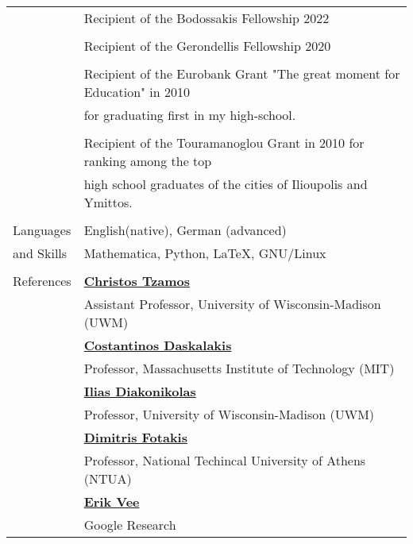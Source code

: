 \documentclass[letterpaper,11pt,oneside]{article}
\begin{document}
\begin{longtable}{@{} l l}
 & Recipient of the Bodossakis Fellowship 2022 \\
 & \\

 & Recipient of the Gerondellis Fellowship 2020 \\
 & \\

 & Recipient of the Eurobank Grant "The great moment for Education" in 2010\\
 & for graduating first in my high-school. \\
 &\\

 & Recipient of the Touramanoglou Grant in 2010 for ranking among the top \\
 & high school graduates of the cities of Ilioupolis and Ymittos. \\
 &\\

  \Large{Languages}   & English(native), German (advanced) \\
\Large{and Skills}    & Mathematica, Python, \LaTeX, GNU/Linux\\
&\\


 \Large{References}
 & \href{http://www.tzamos.com}{\textbf{Christos Tzamos}} \\
 & Assistant Professor, University of Wisconsin-Madison (UWM) \\
 & \href{https://people.csail.mit.edu/costis/}{\textbf{Costantinos Daskalakis}} \\ 
 & Professor, Massachusetts Institute of Technology (MIT) \\
 & \href{http://www.iliasdiakonikolas.org}{\textbf{Ilias Diakonikolas}} \\
 & Professor, University of Wisconsin-Madison (UWM) \\
 & \href{http://www.fotakis.cs.ntua.gr}{\textbf{Dimitris Fotakis}} \\
 & Professor, National Techincal University of Athens (NTUA) \\
 & \href{https://scholar.google.com/citations?user=1u8drP0AAAAJ&hl=en
}{\textbf{Erik Vee}} \\
 & Google Research \\
\end{longtable}
\end{document}
